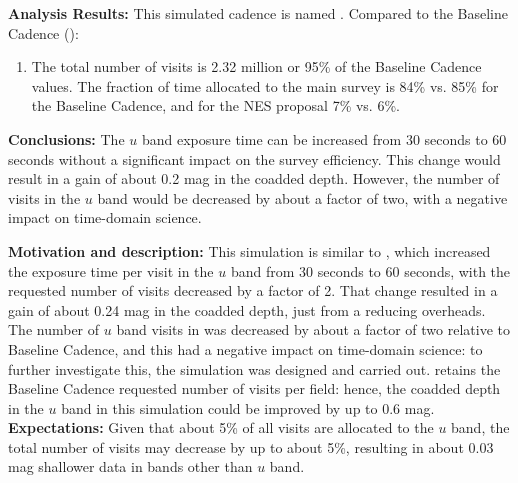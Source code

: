 {\bf Analysis Results:} This simulated cadence is named .  Compared
to the Baseline Cadence ():
\begin{enumerate}
\item The total number of visits is 2.32 million or 95\% of the
Baseline Cadence values. The fraction of time allocated to the main
survey is 84\% vs. 85\% for the Baseline Cadence, and for the NES
proposal 7\% vs. 6\%. %
\end{enumerate}

{\bf Conclusions:} The $u$ band exposure time can be increased from 30
seconds to 60 seconds without a significant impact on the survey
efficiency. This change would result in a gain of about 0.2 mag in the
coadded depth. However, the number of visits in the $u$ band would be
decreased by about a factor of two, with a negative impact on
time-domain science.



{\bf Motivation and description:} This simulation is similar to
, which increased the exposure time
per visit in the $u$ band from 30 seconds to 60 seconds, with the
requested number of visits decreased by a factor of 2. That change
resulted in a gain of about 0.24 mag in the coadded depth, just from a reducing overheads. The
number of $u$ band visits in  was
decreased by about a factor of two relative to Baseline Cadence, and this had a negative impact on
time-domain science: to further investigate this, the  simulation was designed and carried out.  retains the Baseline Cadence
requested number of visits per field: hence, the coadded depth in the
$u$ band in this simulation could be improved by up to 0.6 mag. \\

{\bf Expectations:}  Given that about 5\% of all visits are allocated
to the $u$ band, the total number of visits may decrease by up to
about 5\%, resulting in about 0.03 mag shallower data in bands other
than $u$ band. \\

